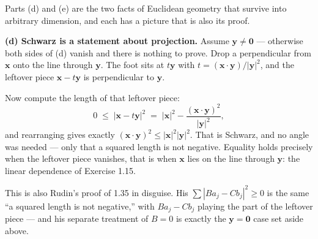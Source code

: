 \begin{deeper}
Parts (d) and (e) are the two facts of Euclidean geometry that survive into
arbitrary dimension, and each has a picture that is also its proof.

\medskip
\textbf{(d) Schwarz is a statement about projection.} Assume
$\mathbf{y} \ne \mathbf{0}$ --- otherwise both sides of (d) vanish and there
is nothing to prove. Drop a perpendicular from $\mathbf{x}$ onto the line
through $\mathbf{y}$. The foot sits at $t\mathbf{y}$ with
$t = (\mathbf{x}\cdot\mathbf{y})/|\mathbf{y}|^2$, and the leftover piece
$\mathbf{x}-t\mathbf{y}$ is perpendicular to $\mathbf{y}$.

\medskip
\begin{center}
\end{center}

\smallskip
Now compute the length of that leftover piece:
\[
  0 \;\le\; |\mathbf{x}-t\mathbf{y}|^2
    \;=\; |\mathbf{x}|^2 - \frac{(\mathbf{x}\cdot\mathbf{y})^2}{|\mathbf{y}|^2},
\]
and rearranging gives exactly
$(\mathbf{x}\cdot\mathbf{y})^2 \le |\mathbf{x}|^2|\mathbf{y}|^2$. That is
Schwarz, and no angle was needed --- only that a squared length is not
negative. Equality holds precisely when the leftover piece vanishes, that is
when $\mathbf{x}$ lies on the line through $\mathbf{y}$: the linear dependence
of Exercise 1.15.

\smallskip
This is also Rudin's proof of 1.35 in disguise. His $\sum|Ba_j - Cb_j|^2 \ge 0$
is the same ``a squared length is not negative,'' with $Ba_j - Cb_j$ playing
the part of the leftover piece --- and his separate treatment of $B=0$
is exactly the $\mathbf{y}=\mathbf{0}$ case set aside above.


\end{deeper}
